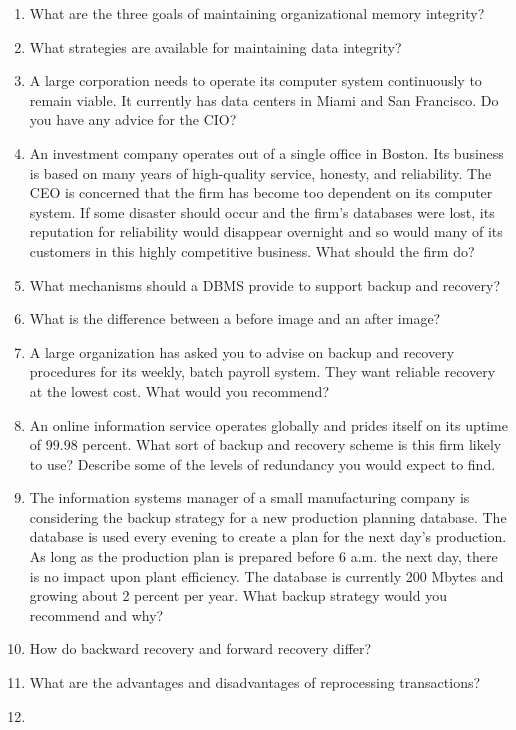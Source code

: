 \documentclass[
]{article}
\begin{document}
\begin{enumerate}
\def\labelenumi{\arabic{enumi}.}
\item
  What are the three goals of maintaining organizational memory
  integrity?
\item
  What strategies are available for maintaining data integrity?
\item
  A large corporation needs to operate its computer system
  continuously to remain viable. It currently has data centers in
  Miami and San Francisco. Do you have any advice for the CIO?
\item
  An investment company operates out of a single office in Boston. Its
  business is based on many years of high-quality service, honesty,
  and reliability. The CEO is concerned that the firm has become too
  dependent on its computer system. If some disaster should occur and
  the firm's databases were lost, its reputation for reliability would
  disappear overnight and so would many of its customers in this
  highly competitive business. What should the firm do?
\item
  What mechanisms should a DBMS provide to support backup and
  recovery?
\item
  What is the difference between a before image and an after image?
\item
  A large organization has asked you to advise on backup and recovery
  procedures for its weekly, batch payroll system. They want reliable
  recovery at the lowest cost. What would you recommend?
\item
  An online information service operates globally and prides itself on
  its uptime of 99.98 percent. What sort of backup and recovery scheme
  is this firm likely to use? Describe some of the levels of
  redundancy you would expect to find.
\item
  The information systems manager of a small manufacturing company is
  considering the backup strategy for a new production planning
  database. The database is used every evening to create a plan for
  the next day's production. As long as the production plan is
  prepared before 6 a.m. the next day, there is no impact upon plant
  efficiency. The database is currently 200 Mbytes and growing about 2
  percent per year. What backup strategy would you recommend and why?
\item
  How do backward recovery and forward recovery differ?
\item
  What are the advantages and disadvantages of reprocessing
  transactions?
\item

\end{enumerate}
\end{document}
